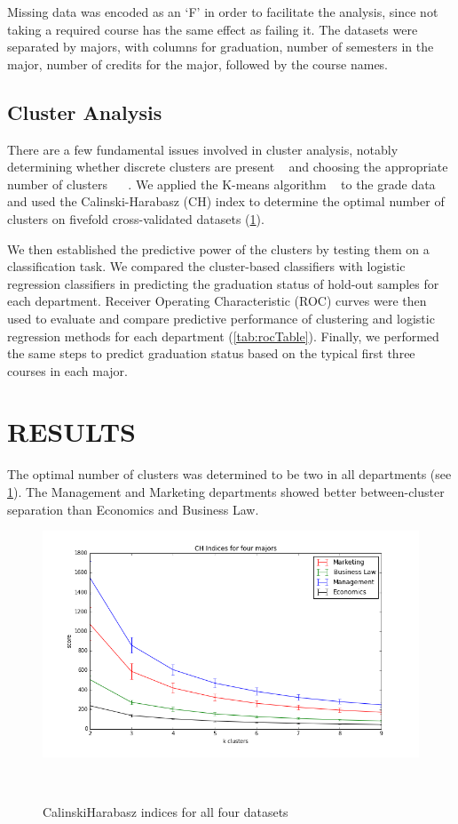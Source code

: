 \documentclass{sigchi}
\begin{document}
Missing data was encoded as an ‘F’ in order to facilitate the analysis, since not taking a required course has the same effect as failing it. The datasets were separated by majors, with columns for graduation, number of semesters in the major, number of credits for the major, followed by the course names. 


\subsection{Cluster Analysis}

There are a few fundamental issues involved in cluster analysis, notably determining whether discrete clusters are present ~\cite{knights2014rethinking} and choosing the appropriate number of clusters ~\cite{gordon1999classification} ~\cite{duda2012pattern}. We applied the K-means algorithm ~\cite{macqueen1967some} to the grade data and used the Calinski-Harabasz (CH) index \cite{calinski1974dendrite} to determine the optimal number of clusters on fivefold cross-validated datasets (\ref{fig:CHindex}).

We then established the predictive power of the clusters by testing them on a classification task. We compared the cluster-based classifiers with logistic regression classifiers in predicting the graduation status of hold-out samples for each department. Receiver Operating Characteristic (ROC) curves were then used to evaluate and compare predictive performance of clustering and logistic regression methods for each department (\ref{tab:rocTable}). Finally, we performed the same steps to predict graduation status based on the typical first three courses in each major.


\section{RESULTS}

The optimal number of clusters was determined to be two in all departments (see \ref{fig:CHindex}). The Management and Marketing departments showed better between-cluster separation than Economics and Business Law. 




\begin{figure}
\centering
  \includegraphics[width=0.4\columnwidth]{figures/ch-4-majors.png}
  \caption{Calinski\-Harabasz indices for all four datasets}~\label{fig:CHindex}
\end{figure}
\end{document}
